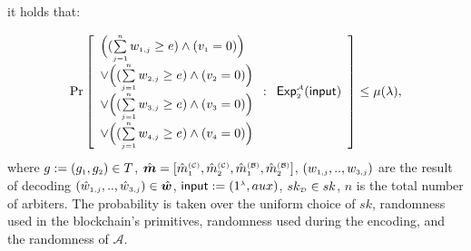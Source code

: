 \begin{definition}
it holds that:

$$ \Pr\left[
  \begin{array}{l}
  
 
\Big( (\sum\limits_{\st j=1}^{\st n}w_{\st 1,j}\geq e) \wedge ( v_{\st 1}=0)\Big) \\
 
 \vee \Big(( \sum\limits_{\st j=1}^{\st n}w_{\st 2,j}\geq e) \wedge ( v_{\st 2}=0)\Big) \\
 \vee  \Big(( \sum\limits_{\st j=1}^{\st n}w_{\st 3,j}\geq e) \wedge ( v_{\st 3}=0)\Big) \\
  \vee  \Big(( \sum\limits_{\st j=1}^{\st n}w_{\st 4,j}\geq e) \wedge ( v_{\st 4}=0)\Big) \\
\end{array} :
    \begin{array}{l}
    \mathsf{Exp}_{\st 2}^{\st\mathcal{A}}(\mathsf{input})\\
\end{array}    \right]\leq \mu(\lambda),$$
where $g:=(g_{\st 1}, g_{\st 2})\in T$, $\hat {\bm m}=[\hat {m}^{\st (\mathcal{C})}_{\st 1}, \hat {m}^{\st (\mathcal{C})}_{\st 2}, \hat {m}^{\st (\mathcal{B})}_{\st 1}, \hat {m}^{\st (\mathcal{B})}_{\st 2}]$, $(w_{\st 1,j},..,w_{\st 3,j})$ are the result of decoding   $(\hat w_{\st 1,j},..,\hat w_{\st 3,j})\in \hat {\bm w}$, $\mathsf{input}:=(1^{\st\lambda},  {aux})$, $ sk_{\st \mathcal{D}}\in sk$, $n$ is the total number of arbiters. The probability is taken over the uniform choice of $sk$, randomness used in the blockchain's primitives, randomness used during the encoding, and  the randomness of $\mathcal{A}$. 
\end{definition}



